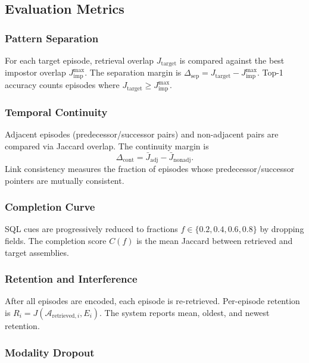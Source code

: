 \subsection{Evaluation Metrics}
\label{sec:metrics}

\subsubsection{Pattern Separation}

For each target episode, retrieval overlap $J_{\mathrm{target}}$ is compared against the best impostor overlap $J_{\mathrm{imp}}^{\max}$. The separation margin is $\Delta_{\mathrm{sep}} = J_{\mathrm{target}} - J_{\mathrm{imp}}^{\max}$. Top-1 accuracy counts episodes where $J_{\mathrm{target}} \geq J_{\mathrm{imp}}^{\max}$.

\subsubsection{Temporal Continuity}

Adjacent episodes (predecessor/successor pairs) and non-adjacent pairs are compared via Jaccard overlap. The continuity margin is
\begin{equation}
\Delta_{\mathrm{cont}} = \bar{J}_{\mathrm{adj}} - \bar{J}_{\mathrm{nonadj}}.
\end{equation}
Link consistency measures the fraction of episodes whose predecessor/successor pointers are mutually consistent.

\subsubsection{Completion Curve}

SQL cues are progressively reduced to fractions $f \in \{0.2, 0.4, 0.6, 0.8\}$ by dropping fields. The completion score $C(f)$ is the mean Jaccard between retrieved and target assemblies.

\subsubsection{Retention and Interference}

After all episodes are encoded, each episode is re-retrieved. Per-episode retention is $R_i = J(\mathcal{A}_{\mathrm{retrieved},i}, E_i)$. The system reports mean, oldest, and newest retention.

\subsubsection{Modality Dropout}

